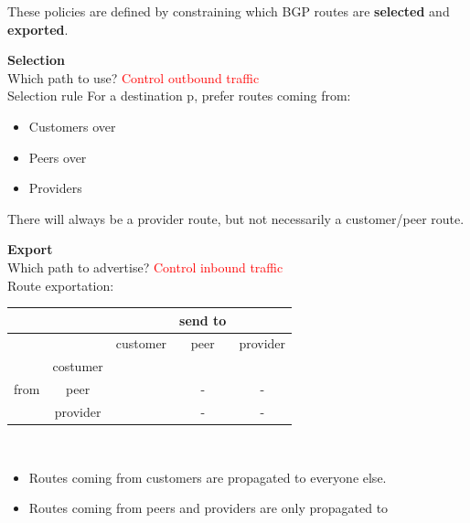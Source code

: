 \documentclass[a4paper, fontsize=8pt, landscape, DIV=1]{scrartcl}
\begin{document}
\begin{multicols*}{4}
	 	These policies are defined by constraining which BGP routes are \textbf{selected} and \textbf{exported}.\par 
	 	
	 	\textbf{Selection}\\
	 	Which path to use? \textcolor{Red}{Control outbound traffic}\\
	 	Selection rule For a destination p, prefer routes coming from: 
	 	\begin{itemize}[noitemsep]
	 		\item Customers over 
	 		\item Peers over 
	 		\item Providers
	 	\end{itemize}
	 	There will always be a provider route, but not necessarily a customer/peer route.\par 
	 	
	 	\textbf{Export}\\
	 	Which path to advertise? \textcolor{Red}{Control inbound traffic}\\
	 	Route exportation:\\
	 	\begin{tabular}{c | c c c c} 
	 			&  &  & send to &  \\ 
 				\hline
	 			&  & customer & peer & provider \\ 
	 			& costumer & \checkmark & \checkmark & \checkmark \\ 
	 			from & peer & \checkmark & - & - \\ 
	 			& provider & \checkmark & - & - \\ 
	 	\end{tabular} \\
 		\vspace{-0.2cm}
 		\begin{itemize}[noitemsep]
 			\item  Routes coming from customers are propagated to everyone else.
 			\item  Routes coming from peers and providers are only propagated to
 		\end{itemize}
 		\par
 		

\end{multicols*}
\end{document}
